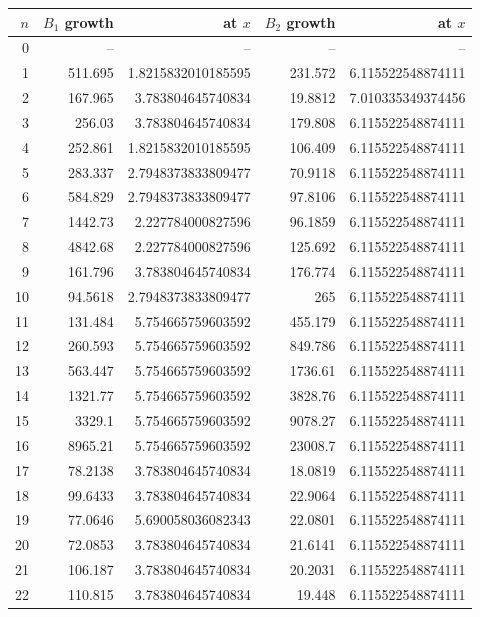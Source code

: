 \begin{tabular}{rrrrr}
\toprule
$n$ & $B_1$ growth & at $x$ & $B_2$ growth & at $x$\\
\midrule
 0 & -- & -- & -- & --\\
 1 & 511.695 & 1.8215832010185595 & 231.572 & 6.115522548874111\\
 2 & 167.965 & 3.783804645740834 & 19.8812 & 7.010335349374456\\
 3 & 256.03 & 3.783804645740834 & 179.808 & 6.115522548874111\\
 4 & 252.861 & 1.8215832010185595 & 106.409 & 6.115522548874111\\
 5 & 283.337 & 2.7948373833809477 & 70.9118 & 6.115522548874111\\
 6 & 584.829 & 2.7948373833809477 & 97.8106 & 6.115522548874111\\
 7 & 1442.73 & 2.227784000827596 & 96.1859 & 6.115522548874111\\
 8 & 4842.68 & 2.227784000827596 & 125.692 & 6.115522548874111\\
 9 & 161.796 & 3.783804645740834 & 176.774 & 6.115522548874111\\
10 & 94.5618 & 2.7948373833809477 & 265 & 6.115522548874111\\
11 & 131.484 & 5.754665759603592 & 455.179 & 6.115522548874111\\
12 & 260.593 & 5.754665759603592 & 849.786 & 6.115522548874111\\
13 & 563.447 & 5.754665759603592 & 1736.61 & 6.115522548874111\\
14 & 1321.77 & 5.754665759603592 & 3828.76 & 6.115522548874111\\
15 & 3329.1 & 5.754665759603592 & 9078.27 & 6.115522548874111\\
16 & 8965.21 & 5.754665759603592 & 23008.7 & 6.115522548874111\\
17 & 78.2138 & 3.783804645740834 & 18.0819 & 6.115522548874111\\
18 & 99.6433 & 3.783804645740834 & 22.9064 & 6.115522548874111\\
19 & 77.0646 & 5.690058036082343 & 22.0801 & 6.115522548874111\\
20 & 72.0853 & 3.783804645740834 & 21.6141 & 6.115522548874111\\
21 & 106.187 & 3.783804645740834 & 20.2031 & 6.115522548874111\\
22 & 110.815 & 3.783804645740834 & 19.448 & 6.115522548874111\\

\end{tabular}
